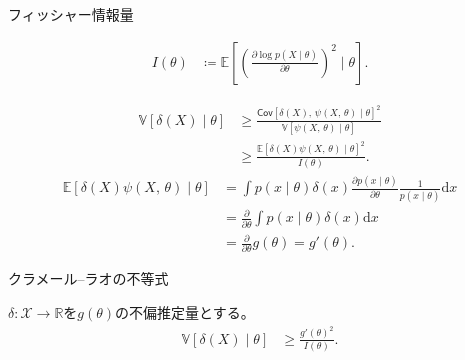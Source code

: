 \documentclass[lualatex,handout]{beamer}
\newcommand{\expt}[1]{\mathbb{E}\left[#1\right]}
\newcommand{\var}[1]{\mathbb{V}\left[#1\right]}
\newcommand{\cov}[1]{\mathsf{Cov}\left[#1\right]}
\theoremstyle{definition}
\begin{document}
\begin{frame}{フィッシャー情報量}
\small
\begin{definition}[フィッシャー情報量]
\vspace{-1em}
\begin{align*}
I(\theta) &\coloneq \expt{\left(\frac{\partial \log p(X\mid\theta)}{\partial\theta}\right)^2\mid\theta}.
\end{align*}
\end{definition}
\begin{align*}
\var{\delta(X)\mid\theta}&\ge\frac{\cov{\delta(X),\,\psi(X,\,\theta)\mid\theta}^2}{\var{\psi(X,\,\theta)\mid\theta}}\\
&\ge\frac{\expt{\delta(X)\psi(X,\,\theta)\mid\theta}^2}{I(\theta)}.
\end{align*}
\begin{align*}
\expt{\delta(X)\psi(X,\,\theta)\mid\theta}&=
\int p(x\mid\theta) \delta(x)\frac{\partial p(x\mid\theta)}{\partial\theta}\frac1{p(x\mid\theta)}\mathrm{d}x\\
&=
\frac{\partial}{\partial\theta}\int p(x\mid\theta) \delta(x)\mathrm{d}x\\
&=
\frac{\partial}{\partial\theta}g(\theta)=g'(\theta).
\end{align*}
\end{frame}

\begin{frame}{クラメール--ラオの不等式}
\begin{theorem}
$\delta\colon\mathcal{X}\to\mathbb{R}$を$g(\theta)$の不偏推定量とする。
\begin{align*}
\var{\delta(X)\mid\theta} &\ge \frac{g'(\theta)^2}{I(\theta)}.
\end{align*}
\end{theorem}
\end{frame}
\end{document}

